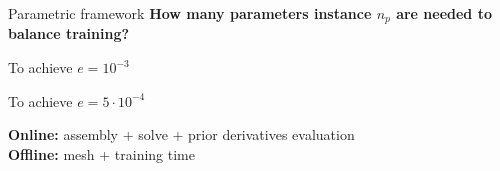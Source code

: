 \begin{frame}{Parametric framework}
	\setlength{\plotwidth}{0.38\textwidth}\setlength{\plotheight}{0.27\textwidth}
	\textbf{How many parameters instance $n_p$ are needed to balance training?}

	\vspace{5pt}

	\begin{minipage}[t]{0.48\linewidth}
		\centering

		\vspace{-4pt}
		To achieve $e=10^{-3}$
	\end{minipage} \hfill
	\begin{minipage}[t]{0.48\linewidth}
		\centering

		\vspace{-4pt}
		To achieve $e=5\cdot 10^{-4}$
	\end{minipage}

	\vspace{4pt}
	{\centering{}\par}

	\vspace{10pt}
	\textbf{Online:} assembly + solve \textcolor{addcolor}{\; + prior derivatives evaluation} \\

	\textbf{Offline:} mesh	\textcolor{addcolor}{\; + training time}
\end{frame}
